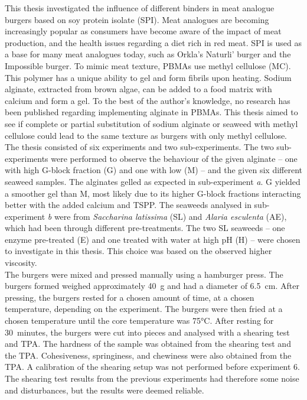 This thesis investigated the influence of different binders in meat analogue burgers based on soy protein isolate (SPI). 
Meat analogues are becoming increasingly popular as consumers have become aware of the impact of meat production, and the health issues regarding a diet rich in red meat. SPI is used as a base for many meat analogues today, such as Orkla’s Naturli’ burger and the Impossible burger. To mimic meat texture, PBMAs use methyl cellulose (MC).
This polymer has a unique ability to gel and form fibrils upon heating. 
Sodium alginate, extracted from brown algae, can be added to a food matrix with calcium and form a gel. To the best of the author’s knowledge, no research has been published regarding implementing alginate in PBMAs. 
This thesis aimed to see if complete or partial substitution of sodium alginate or seaweed with methyl cellulose could lead to the same texture as burgers with only methyl cellulose.\\

The thesis consisted of six experiments and two sub-experiments. The two sub-experiments were performed to observe the behaviour of the given alginate – one with high G-block fraction (G) and one with low (M) – and the given six different seaweed samples. The alginates gelled as expected in sub-experiment \textit{a}. G yielded a smoother gel than M, most likely due to its higher G-block fractions interacting better with the added calcium and TSPP. 
The seaweeds analysed in sub-experiment \textit{b} were from \textit{Saccharina latissima} (SL) and \textit{Alaria esculenta} (AE), which had been through different pre-treatments. The two SL seaweeds – one enzyme pre-treated (E) and one treated with water at high pH (H) – were chosen to investigate in this thesis. This choice was based on the observed higher viscosity.\\

The burgers were mixed and pressed manually using a hamburger press. 
The burgers formed weighed approximately 40~g and had a diameter of 6.5~cm. 
After pressing, the burgers rested for a chosen amount of time, at a chosen temperature, depending on the experiment. 
The burgers were then fried at a chosen temperature until the core temperature was 75°C. 
After resting for 30~minutes, the burgers were cut into pieces and analysed with a shearing test and TPA. The hardness of the sample was obtained from the shearing test and the TPA. 
Cohesiveness, springiness, and chewiness were also obtained from the TPA.
A calibration of the shearing setup was not performed before experiment 6. The shearing test results from the previous experiments had therefore some noise and disturbances, but the results were deemed reliable.

